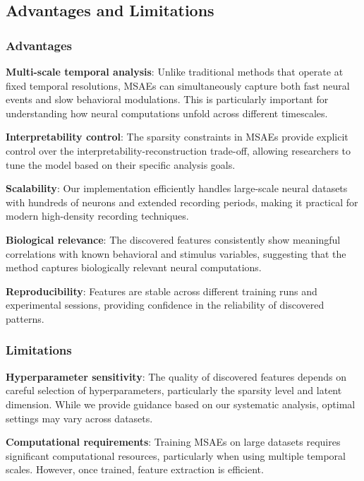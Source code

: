 \subsection{Advantages and Limitations}

\subsubsection{Advantages}

\textbf{Multi-scale temporal analysis}: Unlike traditional methods that operate at fixed temporal resolutions, MSAEs can simultaneously capture both fast neural events and slow behavioral modulations. This is particularly important for understanding how neural computations unfold across different timescales.

\textbf{Interpretability control}: The sparsity constraints in MSAEs provide explicit control over the interpretability-reconstruction trade-off, allowing researchers to tune the model based on their specific analysis goals.

\textbf{Scalability}: Our implementation efficiently handles large-scale neural datasets with hundreds of neurons and extended recording periods, making it practical for modern high-density recording techniques.

\textbf{Biological relevance}: The discovered features consistently show meaningful correlations with known behavioral and stimulus variables, suggesting that the method captures biologically relevant neural computations.

\textbf{Reproducibility}: Features are stable across different training runs and experimental sessions, providing confidence in the reliability of discovered patterns.

\subsubsection{Limitations}

\textbf{Hyperparameter sensitivity}: The quality of discovered features depends on careful selection of hyperparameters, particularly the sparsity level and latent dimension. While we provide guidance based on our systematic analysis, optimal settings may vary across datasets.

\textbf{Computational requirements}: Training MSAEs on large datasets requires significant computational resources, particularly when using multiple temporal scales. However, once trained, feature extraction is efficient.

